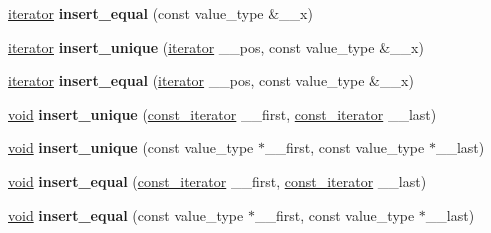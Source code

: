 \begin{DoxyCompactItemize}
\item 
\mbox{\label{class___rb__tree_a63eaaa3df2b57c0b8edb1f6fd7b696bb}} 
\hyperlink{struct___rb__tree__iterator}{iterator} {\bfseries insert\+\_\+equal} (const value\+\_\+type \&\+\_\+\+\_\+x)
\item 
\mbox{\label{class___rb__tree_a543605b6f4a0c8b4629d86c76db3d297}} 
\hyperlink{struct___rb__tree__iterator}{iterator} {\bfseries insert\+\_\+unique} (\hyperlink{struct___rb__tree__iterator}{iterator} \+\_\+\+\_\+pos, const value\+\_\+type \&\+\_\+\+\_\+x)
\item 
\mbox{\label{class___rb__tree_a394e0635116e83f209d3e4a9981d4384}} 
\hyperlink{struct___rb__tree__iterator}{iterator} {\bfseries insert\+\_\+equal} (\hyperlink{struct___rb__tree__iterator}{iterator} \+\_\+\+\_\+pos, const value\+\_\+type \&\+\_\+\+\_\+x)
\item 
\mbox{\label{class___rb__tree_aad72e1ea4939387b8a0a0ce41f64a924}} 
\hyperlink{interfacevoid}{void} {\bfseries insert\+\_\+unique} (\hyperlink{struct___rb__tree__iterator}{const\+\_\+iterator} \+\_\+\+\_\+first, \hyperlink{struct___rb__tree__iterator}{const\+\_\+iterator} \+\_\+\+\_\+last)
\item 
\mbox{\label{class___rb__tree_adc384a6f81880cd81d50cdcca33276ba}} 
\hyperlink{interfacevoid}{void} {\bfseries insert\+\_\+unique} (const value\+\_\+type $\ast$\+\_\+\+\_\+first, const value\+\_\+type $\ast$\+\_\+\+\_\+last)
\item 
\mbox{\label{class___rb__tree_a4bfd057bf66c2221c901218b9a391049}} 
\hyperlink{interfacevoid}{void} {\bfseries insert\+\_\+equal} (\hyperlink{struct___rb__tree__iterator}{const\+\_\+iterator} \+\_\+\+\_\+first, \hyperlink{struct___rb__tree__iterator}{const\+\_\+iterator} \+\_\+\+\_\+last)
\item 
\mbox{\label{class___rb__tree_abe35892b552c7d97c151fc3d1dffd5d9}} 
\hyperlink{interfacevoid}{void} {\bfseries insert\+\_\+equal} (const value\+\_\+type $\ast$\+\_\+\+\_\+first, const value\+\_\+type $\ast$\+\_\+\+\_\+last)
\item 
\mbox{\label{class___rb__tree_af89f7874d20abb8202f08ab325016d57}} 

\end{DoxyCompactItemize}
